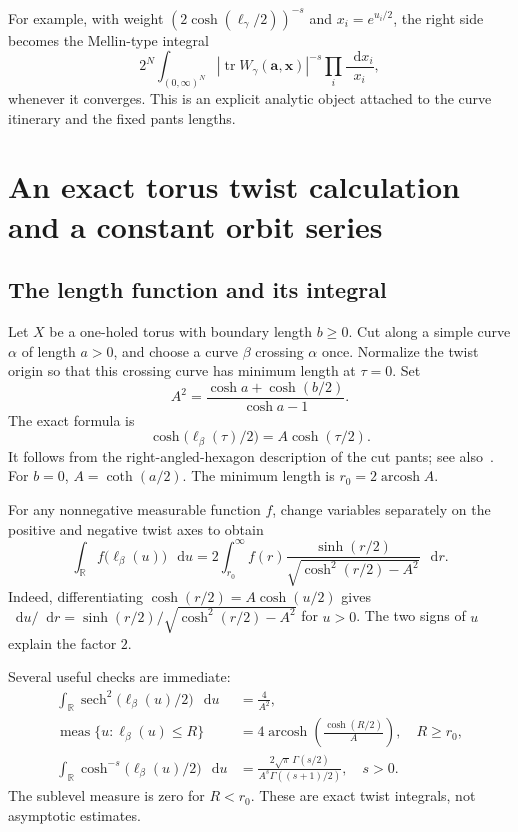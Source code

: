 \documentclass[11pt,a4paper]{article}
\numberwithin{equation}{section}
\theoremstyle{definition}
\theoremstyle{remark}
\DeclareMathOperator{\arcosh}{arcosh}
\DeclareMathOperator{\sech}{sech}
\DeclareMathOperator{\tr}{tr}
\newcommand{\dd}{\mathop{}\!\mathrm d}
\newcommand{\RR}{\mathbb R}
\newcommand{\abs}[1]{\left|#1\right|}
\begin{document}
For example, with weight $(2\cosh(\ell_\gamma/2))^{-s}$ and
$x_i=e^{u_i/2}$, the right side becomes the Mellin-type integral
\begin{equation}
 2^N\int_{(0,\infty)^N}
 \abs{\tr W_\gamma(\mathbf a,\mathbf x)}^{-s}
             \prod_i\frac{\dd x_i}{x_i},
 \label{eq:mellin}
\end{equation}
whenever it converges. This is an explicit analytic object attached to the
curve itinerary and the fixed pants lengths.

\section{An exact torus twist calculation and a constant orbit series}
\label{sec:exacttwist}

\subsection{The length function and its integral}

Let $X$ be a one-holed torus with boundary length $b\ge0$. Cut along a
simple curve $\alpha$ of length $a>0$, and choose a curve $\beta$ crossing
$\alpha$ once. Normalize the twist origin so that this crossing curve
has minimum length at $\tau=0$. Set
\begin{equation}
 A^2=\frac{\cosh a+\cosh(b/2)}{\cosh a-1}.
 \label{eq:Atwist}
\end{equation}
The exact formula is
\begin{equation}
 \boxed{\cosh\bigl(\ell_\beta(\tau)/2\bigr)=A\cosh(\tau/2).}
 \label{eq:torustwist}
\end{equation}
It follows from the right-angled-hexagon description of the cut pants;
see also~\cite[Proposition 3.1]{ALPS}. For $b=0$,
$A=\coth(a/2)$. The minimum length is $r_0=2\arcosh A$.

For any nonnegative measurable function $f$, change variables separately
on the positive and negative twist axes to obtain
\begin{equation}
 \int_{\RR}f\bigl(\ell_\beta(u)\bigr)\,\dd u
 =2\int_{r_0}^\infty
 f(r)\frac{\sinh(r/2)}{\sqrt{\cosh^2(r/2)-A^2}}\,\dd r.
 \label{eq:toruscoarea}
\end{equation}
Indeed, differentiating $\cosh(r/2)=A\cosh(u/2)$ gives
$\dd u/\dd r=\sinh(r/2)/\sqrt{\cosh^2(r/2)-A^2}$ for $u>0$.
The two signs of $u$ explain the factor $2$.

Several useful checks are immediate:
\begin{align}
 \int_{\RR}\sech^2\bigl(\ell_\beta(u)/2\bigr)\,\dd u
     &=\frac4{A^2},\label{eq:sechintegral}\\
 \operatorname{meas}\{u:\ell_\beta(u)\le R\}
     &=4\arcosh\left(\frac{\cosh(R/2)}{A}\right),\quad R\ge r_0,
       \label{eq:sublevel}\\
 \int_{\RR}\cosh^{-s}\bigl(\ell_\beta(u)/2\bigr)\,\dd u
     &=\frac{2\sqrt\pi\,\Gamma(s/2)}
             {A^s\Gamma((s+1)/2)},\quad s>0.
       \label{eq:betaintegral}
\end{align}
The sublevel measure is zero for $R<r_0$. These are exact twist integrals,
not asymptotic estimates.
\end{document}
